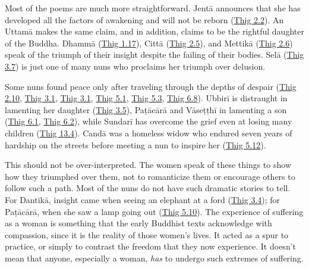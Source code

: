 \documentclass[12pt,openany]{book}%
\begin{document}
Most of the poems are much more straightforward. \textsanskrit{Jentā} announces that she has developed all the factors of awakening and will not be reborn (\href{https://suttacentral.net/thig2.2}{Thig 2.2}). An \textsanskrit{Uttamā} makes the same claim, and in addition, claims to be the rightful daughter of the Buddha. \textsanskrit{Dhammā} (\href{https://suttacentral.net/thig1.17}{Thig 1.17}), \textsanskrit{Cittā} (\href{https://suttacentral.net/thig2.5}{Thig 2.5}), and \textsanskrit{Mettikā} (\href{https://suttacentral.net/thig2.6}{Thig 2.6}) speak of the triumph of their insight despite the failing of their bodies. \textsanskrit{Selā} (\href{https://suttacentral.net/thig3.7}{Thig 3.7}) is just one of many nuns who proclaims her triumph over delusion.

Some nuns found peace only after traveling through the depths of despair (\href{https://suttacentral.net/thig2.10}{Thig 2.10}, \href{https://suttacentral.net/thig3.1}{Thig 3.1}, \href{https://suttacentral.net/thig3.1}{Thig 3.1}, \href{https://suttacentral.net/thig5.1}{Thig 5.1}, \href{https://suttacentral.net/thig5.3}{Thig 5.3}, \href{https://suttacentral.net/thig6.8}{Thig 6.8}). \textsanskrit{Ubbirī} is distraught in lamenting her daughter (\href{https://suttacentral.net/thig3.5}{Thig 3.5}), \textsanskrit{Paṭācārā} and \textsanskrit{Vāseṭṭhī} in lamenting a son (\href{https://suttacentral.net/thig6.1}{Thig 6.1}, \href{https://suttacentral.net/thig6.2}{Thig 6.2}), while \textsanskrit{Sundarī} has overcome the grief even at losing many children (\href{https://suttacentral.net/thig13.4}{Thig 13.4}). \textsanskrit{Candā} was a homeless widow who endured seven years of hardship on the streets before meeting a nun to inspire her (\href{https://suttacentral.net/thig5.12}{Thig 5.12}).

This should not be over-interpreted. The women speak of these things to show how they triumphed over them, not to romanticize them or encourage others to follow such a path. Most of the nuns do not have such dramatic stories to tell. For \textsanskrit{Dantikā}, insight came when seeing an elephant at a ford (\href{https://suttacentral.net/thig3.4}{Thig 3.4}); for \textsanskrit{Paṭācārā}, when she saw a lamp going out (\href{https://suttacentral.net/thig5.10}{Thig 5.10}). The experience of suffering as a woman is something that the early Buddhist texts acknowledge with compassion, since it is the reality of those women’s lives. It acted as a spur to practice, or simply to contrast the freedom that they now experience. It doesn’t mean that anyone, especially a woman, \emph{has} to undergo such extremes of suffering.
\end{document}
